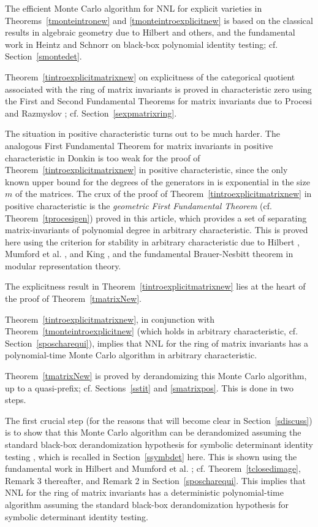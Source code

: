 \documentclass[11pt]{article}
\begin{document}
The  efficient  Monte Carlo algorithm for NNL for explicit varieties 
in Theorems~\ref{tmonteintronew} and \ref{tmonteintroexplicitnew}  
is based on the classical results in  algebraic geometry due to Hilbert and others, and  the  fundamental work 
in Heintz and Schnorr \cite{schnorr} on black-box polynomial identity
testing; cf. Section~\ref{smontedet}. 


Theorem~\ref{tintroexplicitmatrixnew} on 
explicitness of the categorical quotient associated with the ring of matrix invariants
is proved    in characteristic zero using the 
First and Second Fundamental Theorems  for matrix invariants 
due to  Procesi and Razmyslov \cite{procesimatrix,razmyslov}; cf. Section~\ref{sexpmatrixring}.

The situation in positive characteristic turns out to be much harder.
The analogous First Fundamental Theorem for matrix invariants in positive characteristic in  
Donkin \cite{donkin}  is  too weak for 
the proof of Theorem~\ref{tintroexplicitmatrixnew} in positive characteristic, 
since the only known upper bound \cite{domokos} for the degrees of 
the generators in \cite{donkin} is exponential in the size $m$ of the matrices.
The crux  of the proof of Theorem~\ref{tintroexplicitmatrixnew} in positive characteristic
is the  {\em geometric  First Fundamental Theorem}  (cf. Theorem~\ref{tprocesigen}) proved in this article, 
which  provides a set of separating \cite{derksenbook} matrix-invariants of polynomial degree  in  arbitrary  characteristic.
This  is proved here using the criterion for stability in  arbitrary characteristic due to Hilbert \cite{hilbert}, 
Mumford et al. \cite{mumford}, and King \cite{king}, 
and the fundamental Brauer-Nesbitt theorem \cite{brauer,eggermont} in modular representation theory.


The explicitness result in Theorem~\ref{tintroexplicitmatrixnew} lies at the heart 
of  the proof of Theorem~\ref{tmatrixNew}.

Theorem~\ref{tintroexplicitmatrixnew}, in conjunction with Theorem~\ref{tmonteintroexplicitnew} 
(which holds in arbitrary characteristic, cf. Section~\ref{sposcharequi}), implies that
NNL for the ring of matrix invariants  has a polynomial-time Monte Carlo algorithm  in arbitrary characteristic.

Theorem~\ref{tmatrixNew} is proved by derandomizing this Monte Carlo algorithm, up to a quasi-prefix; cf. Sections~\ref{sstit}
and \ref{smatrixpos}.
This is done in two steps.

The first  crucial step (for the reasons that will become clear in Section~\ref{sdiscuss})
is to show that this Monte Carlo algorithm can be 
derandomized assuming the standard black-box derandomization
hypothesis for symbolic determinant identity testing \cite{schnorr,impa,russell,agrawal}, 
which is recalled in Section~\ref{ssymbdet} here.
This is shown using the 
fundamental work in Hilbert \cite{hilbert} and Mumford et al. \cite{mumford}; cf. Theorem~\ref{tclosedimage}, Remark 3 
thereafter, and Remark 2 in Section~\ref{sposcharequi}.
This implies that NNL for the ring of matrix invariants has a deterministic polynomial-time algorithm 
assuming the standard black-box derandomization hypothesis
for symbolic determinant identity testing.
\end{document}
